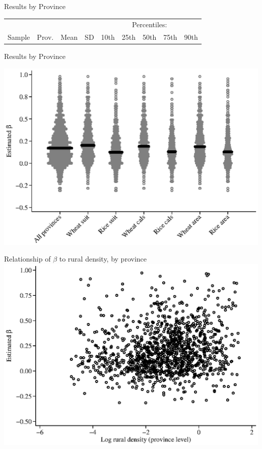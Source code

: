 \documentclass[10pt, xcolor=dvipsnames]{beamer}
\begin{document}
\begin{frame}{Results by Province}

{\scriptsize
\begin{tabularx}{\textwidth}{lrrrXXXXX}
\midrule
           &       &      &     & \multicolumn{5}{c}{Percentiles:} \\ \cmidrule{5-9}
Sample & Prov. & Mean & SD  & 10th    & 25th    & 50th & 75th & 90th \\
\midrule

\midrule
\end{tabularx}
}

\hfill \hyperlink{robustness}{}
\end{frame}

\begin{frame}{Results by Province}
\begin{center}
\includegraphics[width=.8\textwidth]{fig_beta_province.eps}
\end{center}
\end{frame}

\begin{frame}{Relationship of $\beta$ to rural density, by province}\label{rurdbeta}
\includegraphics[width=.8\textwidth]{fig_beta_rurd.eps}
\hfill \hyperlink{eos}{}
\end{frame}
\end{document}
